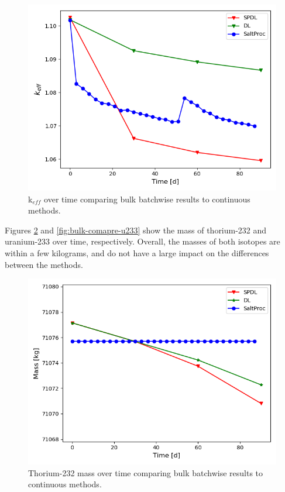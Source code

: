 \begin{figure}[H]
  \centering
  \includegraphics[scale=0.7]{images/soln-3-keff.png}
  \caption{k$_{eff}$ over time comparing bulk batchwise results to continuous methods.}
   \label{fig:bulk-comapre-keff}
\end{figure}

Figures \ref{fig:bulk-comapre-th232} and \ref{fig:bulk-comapre-u233} show the mass of thorium-232 and uranium-233 over time, respectively. Overall, the masses of both isotopes are within a few kilograms, and do not have a large impact on the differences between the methods. 

\begin{figure}[H]
  \centering
  \includegraphics[scale=0.7]{images/soln-3-Th232.png}
  \caption{Thorium-232 mass over time comparing bulk batchwise results to continuous methods.}
   \label{fig:bulk-comapre-th232}
\end{figure}

